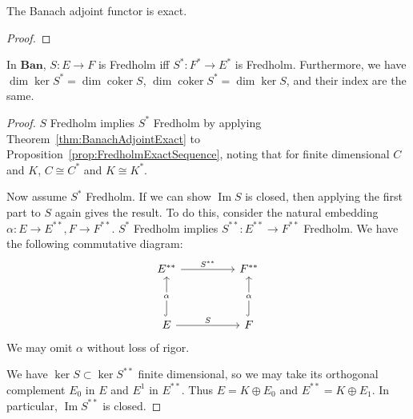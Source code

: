 \begin{theorem}
	\label{thm:BanachAdjointExact}
	The Banach adjoint functor is exact.
\end{theorem}
\begin{proof}
\end{proof}


\begin{proposition}
	\label{prop:FredholmAdjoint}
	In $\mathbf{Ban}$, $S: E \to F$ is Fredholm iff $S^*: F^* \to E^*$ is Fredholm. Furthermore, we have $\operatorname{dim} \operatorname{ker} S^* = \operatorname{dim} \operatorname{coker} S$, $\operatorname{dim} \operatorname{coker} S^* = \operatorname{dim} \operatorname{ker} S$, and their index are the same.
\end{proposition}
\begin{proof}
	$S$ Fredholm implies $S^*$ Fredholm by applying Theorem~\ref{thm:BanachAdjointExact} to Proposition~\ref{prop:FredholmExactSequence}, noting that for finite dimensional $C$ and $K$, $C \cong C^*$ and $K \cong K^*$. 

	Now assume $S^*$ Fredholm. If we can show $\operatorname{Im} S$ is closed, then applying the first part to $S$ again gives the result. To do this, consider the natural embedding $\alpha: E\to E^{* *}, F \to F^{* *}$. $S^*$ Fredholm implies $S^{* *}: E^{* *} \to F^{* *}$ Fredholm. We have the following commutative diagram:
\[\begin{tikzcd}[ampersand replacement=\&]
	{E^{* *}} \&\& {F^{* *}} \\
	\\
	E \&\& F
	\arrow["{S^{* *}}", from=1-1, to=1-3]
	\arrow["S", from=3-1, to=3-3]
	\arrow["\alpha"{description}, hook, from=3-3, to=1-3]
	\arrow["\alpha"{description}, hook, from=3-1, to=1-1]
\end{tikzcd}\]
We may omit $\alpha$ without loss of rigor.

We have $\operatorname{ker} S \subset \operatorname{ker} S^{* *}$ finite dimensional, so  we may take its orthogonal complement $E_0$ in $E$ and $E^1$ in $E^{* *}$. Thus  $E = K \oplus E_0$ and $E^{* *} = K \oplus E_1$. In particular, $\operatorname{Im} S^{* *}$ is closed.


\end{proof}
